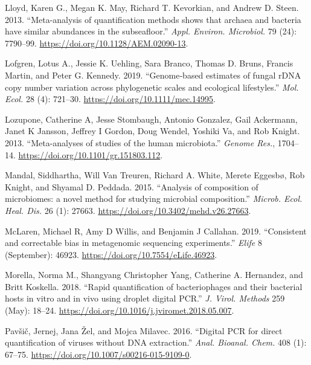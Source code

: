 \documentclass[
]{article}
\newlength{\cslhangindent}
\newlength{\cslentryspacingunit} %
\newenvironment{CSLReferences}[2] %
 {%
  \setlength{\parindent}{0pt}
  \ifodd #1
  \let\oldpar\par
  \def\par{\hangindent=\cslhangindent\oldpar}
  \fi
  \setlength{\parskip}{#2\cslentryspacingunit}
 }%
 {}
\begin{document}
\begin{CSLReferences}{1}{0}
\leavevmode{}%
Lloyd, Karen G., Megan K. May, Richard T. Kevorkian, and Andrew D. Steen. 2013. {``{Meta-analysis of quantification methods shows that archaea and bacteria have similar abundances in the subseafloor}.''} \emph{Appl. Environ. Microbiol.} 79 (24): 7790--99. \url{https://doi.org/10.1128/AEM.02090-13}.

\leavevmode{}%
Lofgren, Lotus A., Jessie K. Uehling, Sara Branco, Thomas D. Bruns, Francis Martin, and Peter G. Kennedy. 2019. {``{Genome‐based estimates of fungal rDNA copy number variation across phylogenetic scales and ecological lifestyles}.''} \emph{Mol. Ecol.} 28 (4): 721--30. \url{https://doi.org/10.1111/mec.14995}.

\leavevmode{}%
Lozupone, Catherine A, Jesse Stombaugh, Antonio Gonzalez, Gail Ackermann, Janet K Jansson, Jeffrey I Gordon, Doug Wendel, Yoshiki Va, and Rob Knight. 2013. {``{Meta-analyses of studies of the human microbiota}.''} \emph{Genome Res.}, 1704--14. \url{https://doi.org/10.1101/gr.151803.112}.

\leavevmode{}%
Mandal, Siddhartha, Will Van Treuren, Richard A. White, Merete Eggesbø, Rob Knight, and Shyamal D. Peddada. 2015. {``{Analysis of composition of microbiomes: a novel method for studying microbial composition}.''} \emph{Microb. Ecol. Heal. Dis.} 26 (1): 27663. \url{https://doi.org/10.3402/mehd.v26.27663}.

\leavevmode{}%
McLaren, Michael R, Amy D Willis, and Benjamin J Callahan. 2019. {``{Consistent and correctable bias in metagenomic sequencing experiments}.''} \emph{Elife} 8 (September): 46923. \url{https://doi.org/10.7554/eLife.46923}.

\leavevmode{}%
Morella, Norma M., Shangyang Christopher Yang, Catherine A. Hernandez, and Britt Koskella. 2018. {``{Rapid quantification of bacteriophages and their bacterial hosts in vitro and in vivo using droplet digital PCR}.''} \emph{J. Virol. Methods} 259 (May): 18--24. \url{https://doi.org/10.1016/j.jviromet.2018.05.007}.

\leavevmode{}%
Pavšič, Jernej, Jana Žel, and Mojca Milavec. 2016. {``{Digital PCR for direct quantification of viruses without DNA extraction}.''} \emph{Anal. Bioanal. Chem.} 408 (1): 67--75. \url{https://doi.org/10.1007/s00216-015-9109-0}.


\end{CSLReferences}
\end{document}
